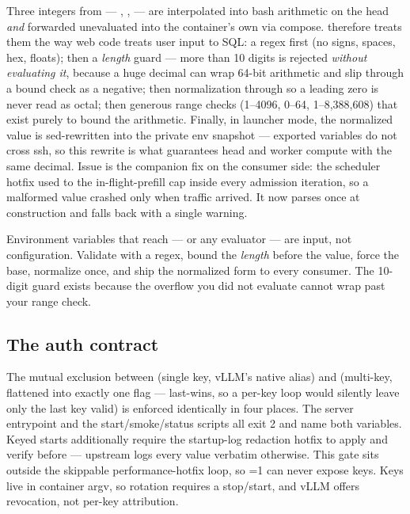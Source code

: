 Three integers from  ---
, ,
 --- are interpolated into bash arithmetic on
the head \emph{and} forwarded unevaluated into the container's own
\code{$(( ))} via compose.  therefore
treats them the way web code treats user input to SQL: a
\code{^[0-9]+$} regex first (no signs, spaces, hex, floats); then a
\emph{length} guard --- more than 10 digits is rejected \emph{without
evaluating it}, because a huge decimal can wrap 64-bit arithmetic and slip
through a bound check as a negative; then normalization through
 so a leading zero is never read as octal; then generous range
checks (1--4096, 0--64, 1--8{,}388{,}608) that exist purely to bound the
arithmetic. Finally, in launcher mode, the normalized value is sed-rewritten
into the private env snapshot --- exported variables do not cross ssh, so this
rewrite is what guarantees head and worker compute with the same decimal.
Issue  is the companion fix on the consumer side: the 
scheduler hotfix used to  the in-flight-prefill cap inside every
admission iteration, so a malformed value crashed only when traffic arrived.
It now parses once at construction and falls back with a single warning.

\begin{hblesson}
Environment variables that reach \code{$(( ))} --- or any evaluator --- are
input, not configuration. Validate with a regex, bound the \emph{length}
before the value, force the base, normalize once, and ship the normalized form
to every consumer. The 10-digit guard exists because the overflow you did not
evaluate cannot wrap past your range check.
\end{hblesson}

\subsection{The auth contract}

The mutual exclusion between  (single key, vLLM's native
alias) and  (multi-key, flattened into exactly one
 flag --- last-wins, so a per-key loop would silently leave
only the last key valid) is enforced identically in four places. The server
entrypoint and the start/smoke/status scripts all exit 2 and name both
variables. Keyed starts additionally require the
startup-log redaction hotfix to apply and verify before  ---
upstream logs every  value verbatim otherwise. This gate
sits outside the skippable performance-hotfix loop, so
=1 can never expose keys. Keys live in container
argv, so rotation requires a stop/start, and vLLM offers revocation, not
per-key attribution.

